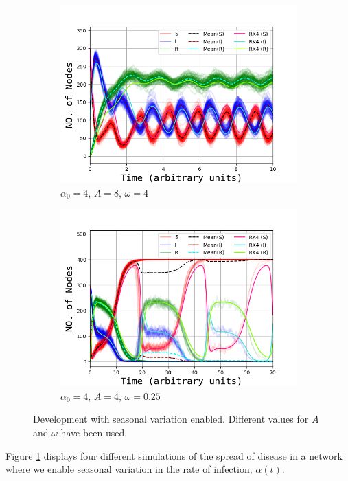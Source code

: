 \begin{figure}[H]
\begin{subfigure}{0.49\linewidth}
			\includegraphics[width=1.1\linewidth]{Figures/OppgC_8_4.png}
			\caption{$\alpha_0 = 4$, $A = 8$, $\omega = 4$}
		\end{subfigure}
		\begin{subfigure}{0.49\linewidth}
		    \includegraphics[width=1.1\linewidth]{Figures/OppgC_4_025.png}
			\caption{$\alpha_0 = 4$, $A = 4$, $\omega = 0.25$}
		\end{subfigure}
		\caption{Development with seasonal variation enabled. Different values for $A$ and $\omega$ have been used.}
		\label{fig:seasonalvar}
	\end{figure}
Figure \ref{fig:seasonalvar} displays four different simulations of the spread of disease in a network where we enable seasonal variation in the rate of infection, $\alpha(t)$. 
